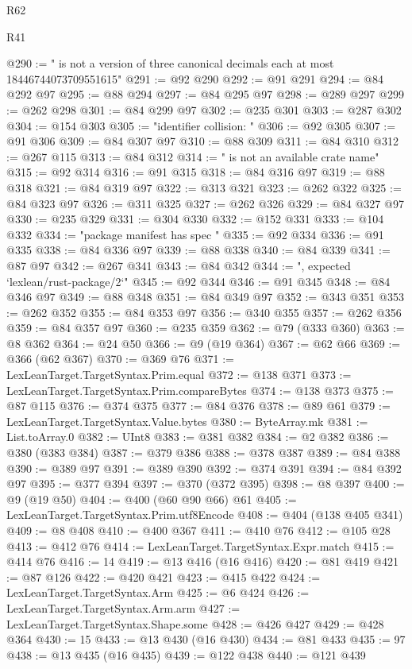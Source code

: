 \begin{lexlean}{R62}
\begin{lexlean}{R41}
\begin{coremodule}
{{{{{{{{{{{{{{{{{{{{{{{{{{{{{{{{{{{{{{{{{{{{{{{{{{{{{{{{{{{{{{{{{{{{{{{{{{{{{{{{{{{{{{{@290 := " is not a version of three canonical decimals each at most 18446744073709551615"
@291 := @92 @290
@292 := @91 @291
@294 := @84 @292 @97
@295 := @88 @294
@297 := @84 @295 @97
@298 := @289 @297
@299 := @262 @298
@301 := @84 @299 @97
@302 := @235 @301
@303 := @287 @302
@304 := @154 @303
@305 := "identifier collision: "
@306 := @92 @305
@307 := @91 @306
@309 := @84 @307 @97
@310 := @88 @309
@311 := @84 @310
@312 := @267 @115
@313 := @84 @312
@314 := " is not an available crate name"
@315 := @92 @314
@316 := @91 @315
@318 := @84 @316 @97
@319 := @88 @318
@321 := @84 @319 @97
@322 := @313 @321
@323 := @262 @322
@325 := @84 @323 @97
@326 := @311 @325
@327 := @262 @326
@329 := @84 @327 @97
@330 := @235 @329
@331 := @304 @330
@332 := @152 @331
@333 := @104 @332
@334 := "package manifest has spec "
@335 := @92 @334
@336 := @91 @335
@338 := @84 @336 @97
@339 := @88 @338
@340 := @84 @339
@341 := @87 @97
@342 := @267 @341
@343 := @84 @342
@344 := ", expected `lexlean/rust-package/2`"
@345 := @92 @344
@346 := @91 @345
@348 := @84 @346 @97
@349 := @88 @348
@351 := @84 @349 @97
@352 := @343 @351
@353 := @262 @352
@355 := @84 @353 @97
@356 := @340 @355
@357 := @262 @356
@359 := @84 @357 @97
@360 := @235 @359
@362 := @79 (@333 @360)
@363 := @8 @362
@364 := @24 @50
@366 := @9 (@19 @364)
@367 := @62 @66
@369 := @366 (@62 @367)
@370 := @369 @76
@371 := LexLeanTarget.TargetSyntax.Prim.equal
@372 := @138 @371
@373 := LexLeanTarget.TargetSyntax.Prim.compareBytes
@374 := @138 @373
@375 := @87 @115
@376 := @374 @375
@377 := @84 @376
@378 := @89 @61
@379 := LexLeanTarget.TargetSyntax.Value.bytes
@380 := ByteArray.mk
@381 := List.toArray.{0}
@382 := UInt8
@383 := @381 @382
@384 := @2 @382
@386 := @380 (@383 @384)
@387 := @379 @386
@388 := @378 @387
@389 := @84 @388
@390 := @389 @97
@391 := @389 @390
@392 := @374 @391
@394 := @84 @392 @97
@395 := @377 @394
@397 := @370 (@372 @395)
@398 := @8 @397
@400 := @9 (@19 @50)
@404 := @400 (@60 @90 @66) @61
@405 := LexLeanTarget.TargetSyntax.Prim.utf8Encode
@408 := @404 (@138 @405 @341)
@409 := @8 @408
@410 := @400 @367
@411 := @410 @76
@412 := @105 @28
@413 := @412 @76
@414 := LexLeanTarget.TargetSyntax.Expr.match
@415 := @414 @76
@416 := 14
@419 := @13 @416 (@16 @416)
@420 := @81 @419
@421 := @87 @126
@422 := @420 @421
@423 := @415 @422
@424 := LexLeanTarget.TargetSyntax.Arm
@425 := @6 @424
@426 := LexLeanTarget.TargetSyntax.Arm.arm
@427 := LexLeanTarget.TargetSyntax.Shape.some
@428 := @426 @427
@429 := @428 @364
@430 := 15
@433 := @13 @430 (@16 @430)
@434 := @81 @433
@435 := 97
@438 := @13 @435 (@16 @435)
@439 := @122 @438
@440 := @121 @439
}}}}}}}}}}}}}}}}}}}}}}}}}}}}}}}}}}}}}}}}}}}}}}}}}}}}}}}}}}}}}}}}}}}}}}}}}}}}}}}}}}}}}}}
\end{coremodule}
\end{lexlean}
\end{lexlean}
